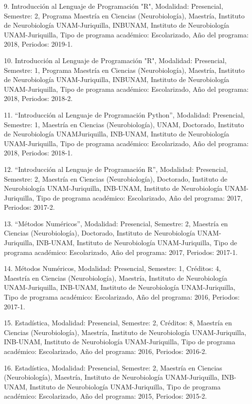 \documentclass[12pt]{article}
\begin{document}
9. Introducción al Lenguaje de Programación "R", Modalidad: Presencial, Semestre: 2, Programa Maestría en Ciencias (Neurobiología), 
Maestría, Instituto de Neurobiología UNAM-Juriquilla, INBUNAM, Instituto de Neurobiología UNAM-Juriquilla, Tipo de programa académico: 
Escolarizado, Año del programa: 2018, Periodos: 2019-1.

10. Introducción al Lenguaje de Programación "R", Modalidad: Presencial, Semestre: 1, Programa Maestría en Ciencias (Neurobiología), 
Maestría, Instituto de Neurobiología UNAM-Juriquilla, INBUNAM, Instituto de Neurobiología UNAM-Juriquilla, Tipo de programa académico: 
Escolarizado, Año del programa: 2018, Periodos: 2018-2.

11. “Introducción al Lenguaje de Programación Python”, Modalidad: Presencial, Semestre: 1, Maestría en Ciencias (Neurobiología), UNAM, 
Doctorado, Instituto de Neurobiología UNAMJuriquilla, INB-UNAM, Instituto de Neurobiología UNAM-Juriquilla, Tipo de programa académico: 
Escolarizado, Año del programa: 2018, Periodos: 2018-1.

12. “Introducción al Lenguaje de Programación R”, Modalidad: Presencial, Semestre: 2, Maestría en Ciencias (Neurobiología), Doctorado, 
Instituto de Neurobiología UNAM-Juriquilla, INB-UNAM, Instituto de Neurobiología UNAM-Juriquilla, Tipo de programa académico: 
Escolarizado, Año del programa: 2017, Periodos: 2017-2.

13. “Métodos Numéricos”, Modalidad: Presencial, Semestre: 2, Maestría en Ciencias (Neurobiología), Doctorado, Instituto de 
Neurobiología UNAM-Juriquilla, INB-UNAM, Instituto de Neurobiología UNAM-Juriquilla, Tipo de programa académico: Escolarizado, Año del 
programa: 2017, Periodos: 2017-1.

14. Métodos Numéricos, Modalidad: Presencial, Semestre: 1, Créditos: 4, Maestría en Ciencias (Neurobiología), Maestría, Instituto de 
Neurobiología UNAM-Juriquilla, INB-UNAM, Instituto de Neurobiología UNAM-Juriquilla, Tipo de programa académico: Escolarizado, Año del 
programa: 2016, Periodos: 2017-1.

15. Estadística, Modalidad: Presencial, Semestre: 2, Créditos: 8, Maestría en Ciencias (Neurobiología), Maestría, Instituto de 
Neurobiología UNAM-Juriquilla, INB-UNAM, Instituto de Neurobiología 
UNAM-Juriquilla, Tipo de programa académico: Escolarizado, Año del programa: 2016, Periodos: 2016-2.

16. Estadística, Modalidad: Presencial, Semestre: 2, Maestría en Ciencias (Neurobiología), Maestría, Instituto de Neurobiología 
UNAM-Juriquilla, INB-UNAM, Instituto de Neurobiología UNAM-Juriquilla, Tipo de programa académico: Escolarizado, Año del programa: 
2015, Periodos: 2015-2.
\end{document}
